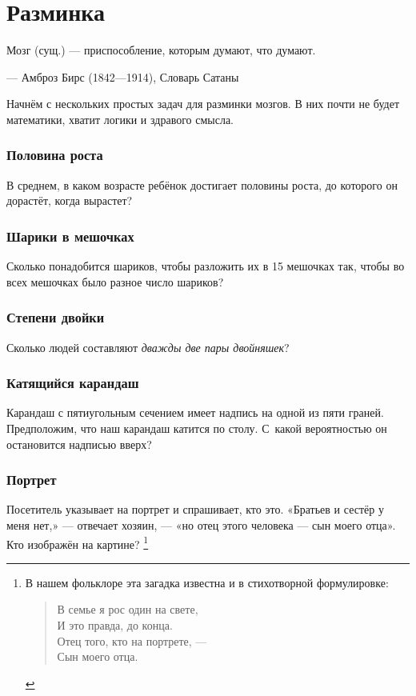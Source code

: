 \chapter{Разминка}

\setlength{\epigraphwidth}{.80\textwidth}
\epigraph{Мозг (сущ.) --- приспособление, которым думают, что думают.}{--- Амброз Бирс (1842---1914), Словарь Сатаны}

Начнём с нескольких простых задач для разминки мозгов.
В них почти не будет математики, хватит логики и здравого смысла.

\subsection*{Половина роста}


В среднем, в каком возрасте ребёнок достигает половины роста, до которого он дорастёт, когда вырастет?

\subsection*{Шарики в мешочках}

Сколько понадобится шариков, чтобы разложить их в 15 мешочках так,
чтобы во всех мешочках было разное число шариков?

\subsection*{Степени двойки}

Сколько людей составляют \emph{дважды две пары двойняшек}?

\subsection*{Катящийся карандаш}

Карандаш с пятиугольным сечением имеет надпись на одной из пяти граней.
Предположим, что наш карандаш катится по столу.
С~какой вероятностью он остановится надписью вверх?

\subsection*{Портрет}

Посетитель указывает на портрет и спрашивает, кто это. 
«Братьев и сестёр у меня нет,» --- отвечает хозяин, --- «но отец этого человека --- сын моего отца».
Кто изображён на картине?%
\footnote{В нашем фольклоре эта загадка известна и в стихотворной формулировке:\\
\begin{verse}
В семье я рос один на свете,\\
И это правда, до конца.\\
Отец того, кто на портрете, ---\\
Сын моего отца.
\end{verse}
\pr}



